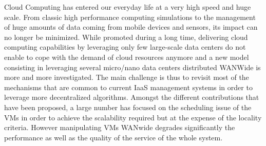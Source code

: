 
Cloud Computing has entered our everyday life at a very high speed and huge scale. From
classic high performance computing simulations to the management of huge amounts of data
coming from mobile devices and sensors, its impact can no longer be minimized.
While promoted during a long time, delivering cloud computing capabilities by leveraging
only few large-scale data centers do not enable to cope with the demand of cloud resources
anymore and a new model consisting in leveraging several micro/nano data centers
distributed WANWide is more and more investigated. The main challenge is thus to revisit
most of the mechanisms that are common to current IaaS management systems in order to
leverage more decentralized algorithms. Amongst the different contributions that have been
proposed, a large number has focused on the scheduling issue of the VMs in order to
achieve the scalability required but at the expense of the locality criteria. However
manipulating VMs WANwide degrades significantly the performance as well as the quality of
the service of the whole system.

% 


